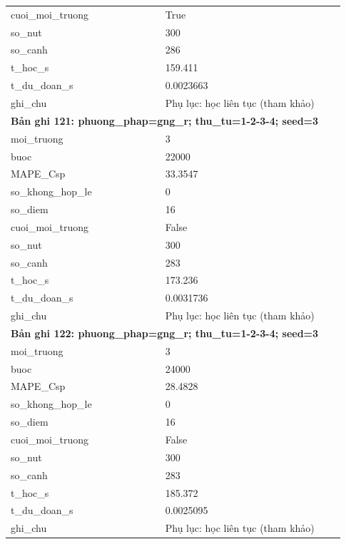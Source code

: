 \begin{longtable}{p{0.43\linewidth}p{0.50\linewidth}}
cuoi\_\allowbreak moi\_\allowbreak truong & True \\
so\_\allowbreak nut & 300 \\
so\_\allowbreak canh & 286 \\
t\_\allowbreak hoc\_\allowbreak s & 159.411 \\
t\_\allowbreak du\_\allowbreak doan\_\allowbreak s & 0.0023663 \\
ghi\_\allowbreak chu & Phụ lục: học liên tục (tham khảo) \\
\midrule
\multicolumn{2}{p{0.95\linewidth}}{\textbf{Bản ghi 121: phuong\_phap=gng\_r; thu\_tu=1-2-3-4; seed=3}} \\
moi\_\allowbreak truong & 3 \\
buoc & 22000 \\
MAPE\_\allowbreak Csp & 33.3547 \\
so\_\allowbreak khong\_\allowbreak hop\_\allowbreak le & 0 \\
so\_\allowbreak diem & 16 \\
cuoi\_\allowbreak moi\_\allowbreak truong & False \\
so\_\allowbreak nut & 300 \\
so\_\allowbreak canh & 283 \\
t\_\allowbreak hoc\_\allowbreak s & 173.236 \\
t\_\allowbreak du\_\allowbreak doan\_\allowbreak s & 0.0031736 \\
ghi\_\allowbreak chu & Phụ lục: học liên tục (tham khảo) \\
\midrule
\multicolumn{2}{p{0.95\linewidth}}{\textbf{Bản ghi 122: phuong\_phap=gng\_r; thu\_tu=1-2-3-4; seed=3}} \\
moi\_\allowbreak truong & 3 \\
buoc & 24000 \\
MAPE\_\allowbreak Csp & 28.4828 \\
so\_\allowbreak khong\_\allowbreak hop\_\allowbreak le & 0 \\
so\_\allowbreak diem & 16 \\
cuoi\_\allowbreak moi\_\allowbreak truong & False \\
so\_\allowbreak nut & 300 \\
so\_\allowbreak canh & 283 \\
t\_\allowbreak hoc\_\allowbreak s & 185.372 \\
t\_\allowbreak du\_\allowbreak doan\_\allowbreak s & 0.0025095 \\
ghi\_\allowbreak chu & Phụ lục: học liên tục (tham khảo) \\

\end{longtable}
